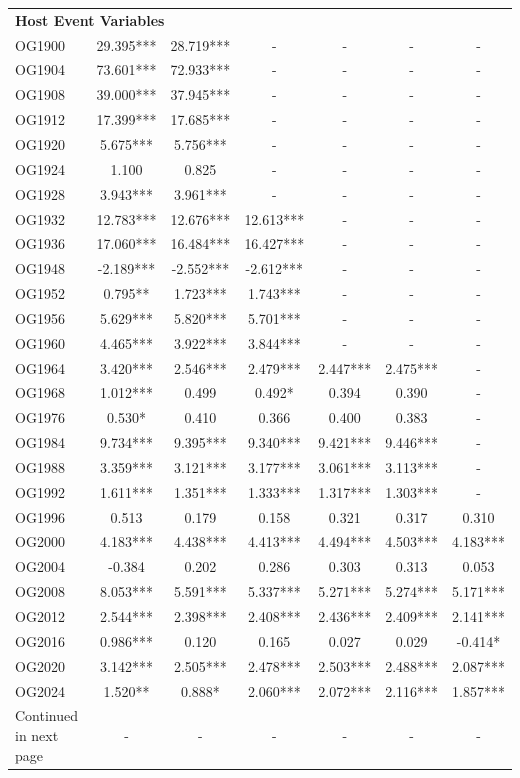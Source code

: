 \begin{table}[H]
{\begin{tabular}{l c c c c c c}
\midrule
\multicolumn{7}{l}{\textbf{Host Event Variables}} \\
OG1900 & 29.395*** & 28.719*** & - & - & - & - \\
OG1904 & 73.601*** & 72.933*** & - & - & - & - \\
OG1908 & 39.000*** & 37.945*** & - & - & - & - \\
OG1912 & 17.399*** & 17.685*** & - & - & - & - \\
OG1920 & 5.675***  & 5.756***  & - & - & - & - \\
OG1924 & 1.100     & 0.825     & - & - & - & - \\
OG1928 & 3.943***  & 3.961***  & - & - & - & - \\
OG1932 & 12.783*** & 12.676*** & 12.613*** & - & - & - \\
OG1936 & 17.060*** & 16.484*** & 16.427*** & - & - & - \\
OG1948 & -2.189*** & -2.552*** & -2.612*** & - & - & - \\
OG1952 & 0.795**   & 1.723***  & 1.743*** & - & - & - \\
OG1956 & 5.629***  & 5.820***  & 5.701*** & - & - & - \\
OG1960 & 4.465***  & 3.922***  & 3.844*** & - & - & - \\
OG1964 & 3.420***  & 2.546***  & 2.479*** & 2.447***  & 2.475***  & - \\
OG1968 & 1.012***  & 0.499     & 0.492* & 0.394     & 0.390     & - \\
OG1976 & 0.530*    & 0.410     & 0.366 & 0.400     & 0.383     & - \\
OG1984 & 9.734***  & 9.395***  & 9.340*** & 9.421***  & 9.446***  & - \\
OG1988 & 3.359***  & 3.121***  & 3.177*** & 3.061***  & 3.113***  & - \\
OG1992 & 1.611***  & 1.351***  & 1.333*** & 1.317***  & 1.303***  & - \\
OG1996 & 0.513     & 0.179     & 0.158 & 0.321     & 0.317     & 0.310 \\
OG2000 & 4.183***  & 4.438***  & 4.413*** & 4.494***  & 4.503***  & 4.183*** \\
OG2004 & -0.384    & 0.202     & 0.286 & 0.303     & 0.313     & 0.053 \\
OG2008 & 8.053***  & 5.591***  & 5.337*** & 5.271***  & 5.274***  & 5.171*** \\
OG2012 & 2.544***  & 2.398***  & 2.408*** & 2.436***  & 2.409***  & 2.141*** \\
OG2016 & 0.986***  & 0.120     & 0.165 & 0.027     & 0.029     & -0.414* \\
OG2020 & 3.142***  & 2.505***  & 2.478*** & 2.503***  & 2.488***  & 2.087*** \\
OG2024 & 1.520**   & 0.888*    & 2.060*** & 2.072***  & 2.116***  & 1.857*** \\
\midrule
Continued in next page & - & - & - & - & - & - \\
\bottomrule
\end{tabular}%
}
\end{table}

